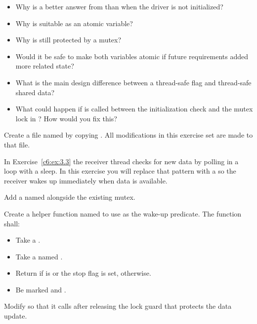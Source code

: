 \begin{itemize}
  \item Why is  a better answer from  than  when the
    driver is not initialized?
  \item Why is  suitable as an atomic variable?
  \item Why is  still protected by a mutex?
  \item Would it be safe to make both variables atomic if future requirements added more related
    state?
  \item What is the main design difference between a thread-safe flag and thread-safe shared data?
  \item What could happen if  is called between the initialization
    check and the mutex lock in ? How would you fix this?
\end{itemize}

\label{c6:set:6}
Create a file named  by copying . All modifications in
this exercise set are made to that file.

\label{c6:ex:6.1}
In Exercise~\ref{c6:ex:3.3} the receiver thread checks for new data by polling in a loop with a
 sleep. In this exercise you will replace that pattern with a
 so the receiver wakes up immediately when data is available.

Add a  named  alongside the existing mutex.

Create a helper function named  to use as the wake-up predicate. The function
shall:
\begin{itemize}
  \item Take a .
  \item Take a  named .
  \item Return  if  is  or the stop flag is set,
     otherwise.
  \item Be marked  and \code{[[nodiscard]]}.
\end{itemize}
Modify  so that it calls  after releasing the lock guard that
protects the data update.

